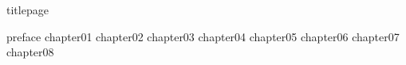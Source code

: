 \documentclass[
	,a4paper
	,12pt
	,oneside
]{book}
\begin{document}
\frontmatter
	{titlepage}
	\restoregeometry
	\tableofcontents

\mainmatter

	{preface}
	{chapter01}
	{chapter02}
	{chapter03}
	{chapter04}
	{chapter05}
	{chapter06}
	{chapter07}
	{chapter08}

\backmatter
\end{document}
